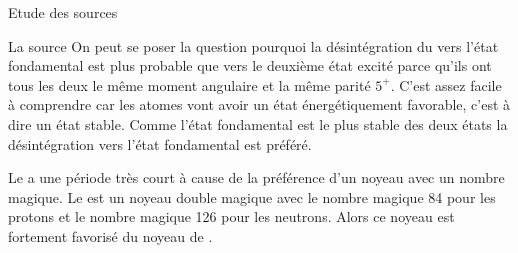 \documentclass[a4paper,11pt]{scrartcl}
\begin{document}
\begin{section}{Etude des sources}
\begin{subsection}{La source }
   On peut se poser la question pourquoi la désintégration du  vers l'état fondamental est plus probable que vers le deuxième état excité parce qu'ils ont tous les deux le même moment angulaire et la même parité $5^+$. C'est assez facile à comprendre car les atomes vont avoir un état énergétiquement favorable, c'est à dire un état stable. Comme l'état fondamental est le plus stable des deux états la désintégration vers l'état fondamental est préféré.

   Le  a une période très court à cause de la préférence d'un noyeau avec un nombre magique. Le  est un noyeau double magique avec le nombre magique 84 pour les protons et le nombre magique 126 pour les neutrons. Alors ce noyeau est fortement favorisé du noyeau de .
  \end{subsection}
 \end{section}
\end{document}
